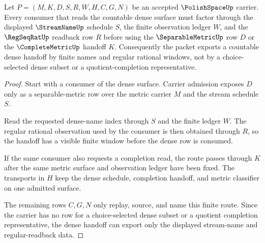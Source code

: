 \begin{theorem}
\label{thm:polish-space-streamname-countable-dense-handoff}
Let $P=(M,K,D,S,R,W,H,C,G,N)$ be an accepted $\PolishSpaceUp$ carrier. Every
consumer that reads the countable dense surface must factor through the
displayed $\StreamNameUp$ schedule $S$, the finite observation ledger $W$, and
the $\RegSeqRatUp$ readback row $R$ before using the $\SeparableMetricUp$ row
$D$ or the $\CompleteMetricUp$ handoff $K$. Consequently the packet exports a
countable dense handoff by finite names and regular rational windows, not by a
choice-selected dense subset or a quotient-completion representative.
\end{theorem}
\begin{proof}
Start with a consumer of the dense surface. Carrier admission exposes $D$
only as a separable-metric row over the metric carrier $M$ and the stream
schedule $S$.

Read the requested dense-name index through $S$ and the finite ledger $W$.
The regular rational observation used by the consumer is then obtained through
$R$, so the handoff has a visible finite window before the dense row is
consumed.

If the same consumer also requests a completion read, the route passes through
$K$ after the same metric surface and observation ledger have been fixed.
The transports in $H$ keep the dense schedule, completion handoff, and metric
classifier on one admitted surface.

The remaining rows $C,G,N$ only replay, source, and name this finite route.
Since the carrier has no row for a choice-selected dense subset or a quotient
completion representative, the dense handoff can export only the displayed
stream-name and regular-readback data.
\end{proof}

